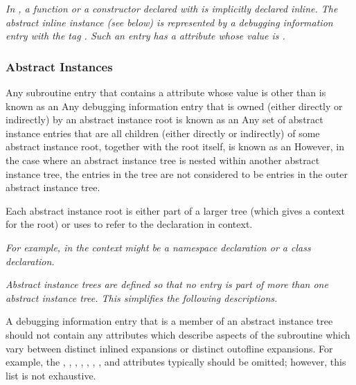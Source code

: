 \textit{In , a function or a constructor declared with
 is implicitly declared inline. The abstract inline
instance (see below) is represented by a debugging information
entry with the tag \DWTAGsubprogram. Such an entry has a
\DWATinline{} attribute whose value is \DWINLinlined.}

\subsubsection{Abstract Instances}
\label{chap:abstractinstances}
Any subroutine entry that contains a
\DWATinline{} attribute 
whose value is other than 
\DWINLnotinlined{}
is known as an
\hypertarget{chap:DWATinlineabstracttinstance}{}
Any debugging information entry that is owned (either
directly or indirectly) by an abstract instance root
is known as an
Any set of abstract instance entries that are all
children (either directly or indirectly) of some abstract
instance root, together with the root itself, is known as an
However, in the case where an abstract instance tree is 
nested within another abstract instance tree, the entries in the 
tree are not considered to be entries in the outer abstract
instance tree.

Each abstract instance root is either part of a larger
tree (which gives a context for the root) or 
uses
\DWATspecification{} 
to refer to the declaration in context.

\textit{For example, in  the context might be a namespace
declaration or a class declaration.}

\textit{Abstract instance trees are defined so that no entry is part
of more than one abstract instance tree. This simplifies the
following descriptions.}

A debugging information entry that is a member of an abstract
instance tree should not contain any attributes which describe
aspects of the subroutine which vary between distinct inlined
expansions or distinct out\dash of\dash line expansions. For example,
the \DWATlowpc,
\DWAThighpc, 
\DWATranges, 
\DWATentrypc, 
\DWATlocation,
\DWATreturnaddr, 
\DWATstartscope, 
and 
\DWATsegment{}
attributes 
typically 
should 
be 
omitted; 
however, 
this 
list
is not exhaustive.

